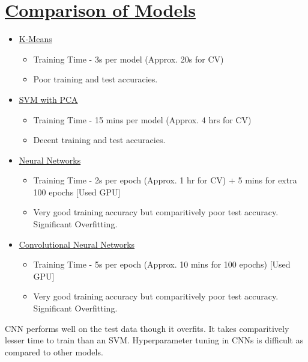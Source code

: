 \documentclass[12pt]{article}
\begin{document}
\section*{\underline{Comparison of Models}}
\begin{addmargin}[0.3in]{0in}
\begin{itemize}
    \item \underline{K-Means}
        \begin{itemize}
            \item Training Time - 3s per model (Approx. 20s for CV)
            \item Poor training and test accuracies.
        \end{itemize}
    \item \underline{SVM with PCA}
        \begin{itemize}
            \item Training Time - 15 mins per model (Approx. 4 hrs for CV)
            \item Decent training and test accuracies.
        \end{itemize}
    \item \underline{Neural Networks}
        \begin{itemize}
            \item Training Time - 2s per epoch (Approx. 1 hr for CV) + 5 mins for extra 100 epochs [Used GPU]
            \item Very good training accuracy but comparitively poor test accuracy. Significant Overfitting.
        \end{itemize}
    \item \underline{Convolutional Neural Networks}
        \begin{itemize}
            \item Training Time - 5s per epoch (Approx. 10 mins for 100 epochs) [Used GPU]
            \item Very good training accuracy but comparitively poor test accuracy. Significant Overfitting. \\
        \end{itemize}
\end{itemize}
CNN performs well on the test data though it overfits. It takes comparitively lesser time to train than an SVM. Hyperparameter tuning in CNNs is difficult as compared to other models.
\end{addmargin}
\end{document}

